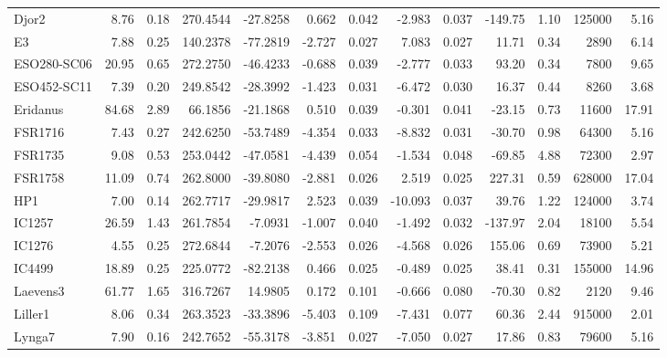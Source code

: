 \begin{longtable}{ | l | r | r| r | r | r | r | r | r | r | r | r | r  |}
            Djor2         &   8.76 & 0.18 & 270.4544 & -27.8258 &   0.662 & 0.042 &  -2.983 &  0.037 & -149.75 &  1.10 &  125000 &  5.16\\ 
            E3            &   7.88 & 0.25 & 140.2378 & -77.2819 &  -2.727 & 0.027 &   7.083 &  0.027 &   11.71 &  0.34 &    2890 &  6.14\\ 
            ESO280-SC06   &  20.95 & 0.65 & 272.2750 & -46.4233 &  -0.688 & 0.039 &  -2.777 &  0.033 &   93.20 &  0.34 &    7800 &  9.65\\ 
            ESO452-SC11   &   7.39 & 0.20 & 249.8542 & -28.3992 &  -1.423 & 0.031 &  -6.472 &  0.030 &   16.37 &  0.44 &    8260 &  3.68\\ 
            Eridanus      &  84.68 & 2.89 &  66.1856 & -21.1868 &   0.510 & 0.039 &  -0.301 &  0.041 &  -23.15 &  0.73 &   11600 & 17.91\\ 
            FSR1716       &   7.43 & 0.27 & 242.6250 & -53.7489 &  -4.354 & 0.033 &  -8.832 &  0.031 &  -30.70 &  0.98 &   64300 &  5.16\\ 
            FSR1735       &   9.08 & 0.53 & 253.0442 & -47.0581 &  -4.439 & 0.054 &  -1.534 &  0.048 &  -69.85 &  4.88 &   72300 &  2.97\\ 
            FSR1758       &  11.09 & 0.74 & 262.8000 & -39.8080 &  -2.881 & 0.026 &   2.519 &  0.025 &  227.31 &  0.59 &  628000 & 17.04\\ 
            HP1           &   7.00 & 0.14 & 262.7717 & -29.9817 &   2.523 & 0.039 & -10.093 &  0.037 &   39.76 &  1.22 &  124000 &  3.74\\ 
            IC1257        &  26.59 & 1.43 & 261.7854 &  -7.0931 &  -1.007 & 0.040 &  -1.492 &  0.032 & -137.97 &  2.04 &   18100 &  5.54\\ 
            IC1276        &   4.55 & 0.25 & 272.6844 &  -7.2076 &  -2.553 & 0.026 &  -4.568 &  0.026 &  155.06 &  0.69 &   73900 &  5.21\\ 
            IC4499        &  18.89 & 0.25 & 225.0772 & -82.2138 &   0.466 & 0.025 &  -0.489 &  0.025 &   38.41 &  0.31 &  155000 & 14.96\\ 
            Laevens3      &  61.77 & 1.65 & 316.7267 &  14.9805 &   0.172 & 0.101 &  -0.666 &  0.080 &  -70.30 &  0.82 &    2120 &  9.46\\ 
            Liller1       &   8.06 & 0.34 & 263.3523 & -33.3896 &  -5.403 & 0.109 &  -7.431 &  0.077 &   60.36 &  2.44 &  915000 &  2.01\\ 
            Lynga7        &   7.90 & 0.16 & 242.7652 & -55.3178 &  -3.851 & 0.027 &  -7.050 &  0.027 &   17.86 &  0.83 &   79600 &  5.16\\ 

\end{longtable}
